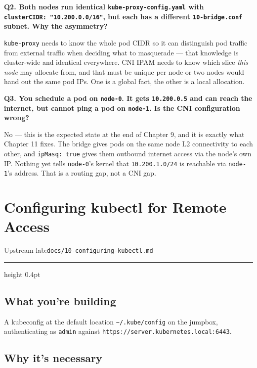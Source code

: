 \documentclass[11pt,oneside]{report}
\newcommand{\upstreamlab}[1]{%
  {\sffamily\footnotesize\color{steel}Upstream lab:\quad\texttt{#1}}\par\vspace{2pt}%
  {\color{rule}\hrule height 0.4pt}\vspace{8pt}}
\begin{document}
\textbf{Q2. Both
nodes run identical
\texttt{kube-}\allowbreak{}\texttt{proxy-}\allowbreak{}\texttt{config.}\allowbreak{}\texttt{yaml}
with
\texttt{clusterCIDR:}\allowbreak{}\texttt{\ "10.}\allowbreak{}\texttt{200.}\allowbreak{}\texttt{0.}\allowbreak{}\texttt{0/}\allowbreak{}\texttt{16"},
but each has a
different
\texttt{10-bridge.conf}
subnet. Why the
asymmetry?}

\texttt{kube-proxy}
needs to know the
whole pod CIDR so it
can distinguish pod
traffic from
external traffic
when deciding what
to masquerade ---
that knowledge is
cluster-wide and
identical
everywhere. CNI IPAM
needs to know which
slice \emph{this
node} may allocate
from, and that must
be unique per node
or two nodes would
hand out the same
pod IPs. One is a
global fact, the
other is a local
allocation.

\textbf{Q3. You
schedule a pod on
\texttt{node-0}. It
gets
\texttt{10.200.0.5}
and can reach the
internet, but cannot
ping a pod on
\texttt{node-1}. Is
the CNI
configuration
wrong?}

No --- this is the
expected state at
the end of Chapter
9, and it is exactly
what Chapter 11
fixes. The bridge
gives pods on the
same node L2
connectivity to each
other, and
\texttt{ipMasq:\ true}
gives them outbound
internet access via
the node's own IP.
Nothing yet tells
\texttt{node-0}'s
kernel that
\texttt{10.200.1.0/24}
is reachable via
\texttt{node-1}'s
address. That is a
routing gap, not a
CNI gap.

\hypertarget{chap-10}{%
\chapter{Configuring
kubectl for Remote
Access}\label{chap-10}}

\upstreamlab{docs/10-configuring-kubectl.md}

\hypertarget{what-youre-building-10}{%
\section{What you're
building}\label{what-youre-building-10}}

A kubeconfig at the
default location
\texttt{\textasciitilde{}/.kube/config}
on the jumpbox,
authenticating as
\texttt{admin}
against
\texttt{https:}\allowbreak{}\texttt{/}\allowbreak{}\texttt{/}\allowbreak{}\texttt{server.}\allowbreak{}\texttt{kubernetes.}\allowbreak{}\texttt{local:}\allowbreak{}\texttt{6443}.

\hypertarget{why-its-necessary-10}{%
\section{Why it's
necessary}\label{why-its-necessary-10}}
\end{document}
